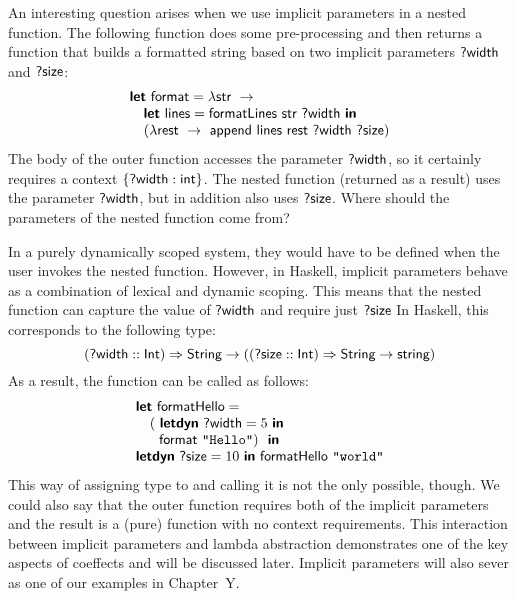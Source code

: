 An interesting question arises when we use implicit parameters in a nested function. The following 
function does some pre-processing and then returns a function that builds a formatted string based 
on two implicit parameters $\textnormal{\sffamily ?width}$ and $\textnormal{\sffamily ?size}$:
%
\begin{equation*}
\begin{array}{l}
\kvd{let}~\ident{format} = \lambda \ident{str}~\rightarrow \\
\quad \kvd{let}~\ident{lines} = \ident{formatLines}~\ident{str}~\ident{?width}~\kvd{in}\\
\quad (\lambda \ident{rest}~\rightarrow~\ident{append}~
         \ident{lines}~\ident{rest}~\ident{?width}~\ident{?size})\\
\end{array}
\end{equation*}
%
The body of the outer function accesses the parameter $\textnormal{\sffamily ?width}$, so it certainly requires a context 
$\{ \textnormal{\sffamily ?width} : \textnormal{\sffamily int} \}$. The nested function (returned as a result) uses the parameter 
$\textnormal{\sffamily ?width}$, but in addition also uses $\textnormal{\sffamily ?size}$. Where should the parameters of the nested 
function come from?

In a purely dynamically scoped system, they would have to be defined when the user invokes the nested function.
However, in Haskell, implicit parameters behave as a combination of lexical and dynamic scoping. This means
that the nested function can capture the value of $\textnormal{\sffamily ?width}$ and require just $\textnormal{\sffamily ?size}$
In Haskell, this corresponds to the following type:
%
\begin{equation*}
(\textnormal{\sffamily ?width} :: \textnormal{\sffamily Int}) \Rightarrow \textnormal{\sffamily String} \rightarrow 
  ((\textnormal{\sffamily ?size} :: \textnormal{\sffamily Int}) \Rightarrow \textnormal{\sffamily String} \rightarrow \textnormal{\sffamily string})
\end{equation*}
%
As a result, the function can be called as follows:
%
\begin{equation*}
\begin{array}{l}
\kvd{let}~\ident{formatHello} = \\
\quad(~\kvd{letdyn}~\ident{?width}=5~\kvd{in}\\
\quad~~\ident{format}~\texttt{"Hello"})~~\kvd{in}\\
\kvd{letdyn}~\ident{?size} = 10~\kvd{in}~\ident{formatHello}~\texttt{"world"}
\end{array}
\end{equation*}
%
This way of assigning type to  and calling it is not the only possible, though. 
We could also say that the outer function requires both of the implicit parameters and the result
is a (pure) function with no context requirements. This interaction between implicit parameters 
and lambda abstraction demonstrates one of the key aspects of coeffects and will be discussed 
later. Implicit parameters will also sever as one of our examples in Chapter~Y.


